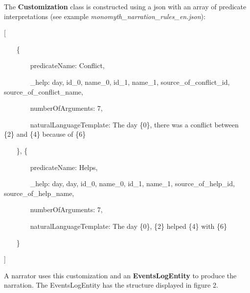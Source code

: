 \documentclass[a4paper]{article}
\newcommand\textstyleStrongEmphasis[1]{\textbf{#1}}
\newcommand\textstyleEmphasis[1]{\textit{#1}}
\begin{document}
The \textstyleStrongEmphasis{Customization} class is constructed using a
json with an array of predicate interpretations (see example
\textstyleEmphasis{monomyth\_narration\_rules\_en.json}):

{\ttfamily
[}

{\ttfamily
~~~ \{}

{\ttfamily
~~~~~~~ {\textquotedbl}predicateName{\textquotedbl}:
{\textquotedbl}Conflict{\textquotedbl},}

{\ttfamily
~~~~~~~ {\textquotedbl}\_help{\textquotedbl}: {\textquotedbl}day, id\_0,
name\_0, id\_1, name\_1, source\_of\_conflict\_id,
source\_of\_conflict\_name{\textquotedbl},}

{\ttfamily
~~~~~~~ {\textquotedbl}numberOfArguments{\textquotedbl}: 7,}

{\ttfamily
~~~~~~~ {\textquotedbl}naturalLanguageTemplate{\textquotedbl}:
{\textquotedbl}The day \{0\}, there was a conflict between \{2\} and
\{4\} because of \{6\}{\textquotedbl}}

{\ttfamily
~~~ \}, \{}

{\ttfamily
~~~~~~~ {\textquotedbl}predicateName{\textquotedbl}:
{\textquotedbl}Helps{\textquotedbl},}

{\ttfamily
~~~~~~~ {\textquotedbl}\_help{\textquotedbl}: {\textquotedbl}day, day,
id\_0, name\_0, id\_1, name\_1, source\_of\_help\_id,
source\_of\_help\_name{\textquotedbl},}

{\ttfamily
~~~~~~~ {\textquotedbl}numberOfArguments{\textquotedbl}: 7,}

{\ttfamily
~~~~~~~ {\textquotedbl}naturalLanguageTemplate{\textquotedbl}:
{\textquotedbl}The day \{0\}, \{2\} helped \{4\} with
\{6\}{\textquotedbl}}

{\ttfamily
~~~ \}}

{\ttfamily
]}

A narrator uses this customization and an
\textstyleStrongEmphasis{EventsLogEntity} to produce the narration. The
EventsLogEntity has the structure displayed in figure 2.
\end{document}
